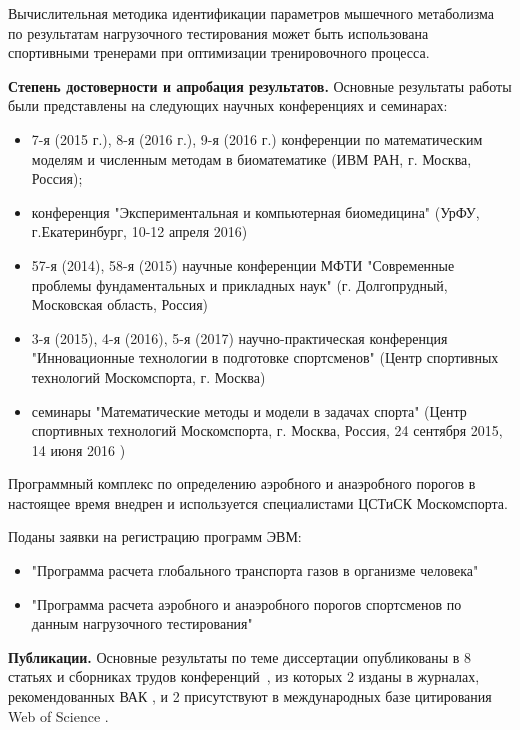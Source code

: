 Вычислительная методика идентификации параметров мышечного метаболизма по результатам нагрузочного тестирования может быть использована спортивными тренерами при оптимизации тренировочного процесса.

\textbf{Степень достоверности и апробация результатов.} Основные результаты работы были представлены на следующих научных конференциях и семинарах:

\noindent
\begin{itemize}
  
  \item 7-я (2015 г.), 8-я (2016 г.), 9-я (2016 г.) конференции по математическим моделям и численным методам в биоматематике (ИВМ РАН, г. Москва, Россия); 
  
  \item конференция "Экспериментальная и компьютерная биомедицина" (УрФУ, г.Екатеринбург, 10-12 апреля 2016)
  
  \item 57-я (2014), 58-я (2015) научные конференции МФТИ "Современные проблемы фундаментальных и прикладных наук" (г. Долгопрудный, Московская область, Россия)
  
  \item 3-я (2015), 4-я (2016), 5-я (2017) научно-практическая конференция "Инновационные технологии в подготовке спортсменов" (Центр спортивных технологий Москомспорта, г. Москва)
  
  \item семинары "Математические методы и модели в задачах спорта" (Центр спортивных технологий Москомспорта, г. Москва, Россия, 24 сентября 2015, 14 июня 2016 )

\end{itemize}

Программный комплекс по определению аэробного и анаэробного порогов в настоящее время внедрен и используется специалистами ЦСТиСК Москомспорта.

Поданы заявки на регистрацию программ ЭВМ:
\begin{itemize}
    \item "Программа расчета глобального транспорта газов в организме человека"
    \item "Программа расчета аэробного и анаэробного порогов спортсменов по данным нагрузочного тестирования"
\end{itemize}

\textbf{Публикации.} 
Основные результаты по теме диссертации опубликованы в 8 статьях и сборниках трудов конференций~\cite{GolovComp2017, GolovCmodel2017, GolovIt2017,GolovSp2015,GolovSp2016,TimmeSp2016,GolovEkb2016,Simakov2015}, из которых 2 изданы в журналах, рекомендованных ВАК \cite{GolovIt2017, GolovCmodel2017}, и 2 присутствуют в международных базе цитирования Web of Science \cite{GolovComp2017, GolovCmodel2017}.

